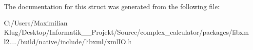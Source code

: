The documentation for this struct was generated from the following file\+:\begin{DoxyCompactItemize}
\item 
C\+:/\+Users/\+Maximilian Klug/\+Desktop/\+Informatik\+\_\+\_\+\+Projekt/\+Source/complex\+\_\+calculator/packages/libxml2..../build/native/include/libxml/xml\+I\+O.\+h\end{DoxyCompactItemize}
